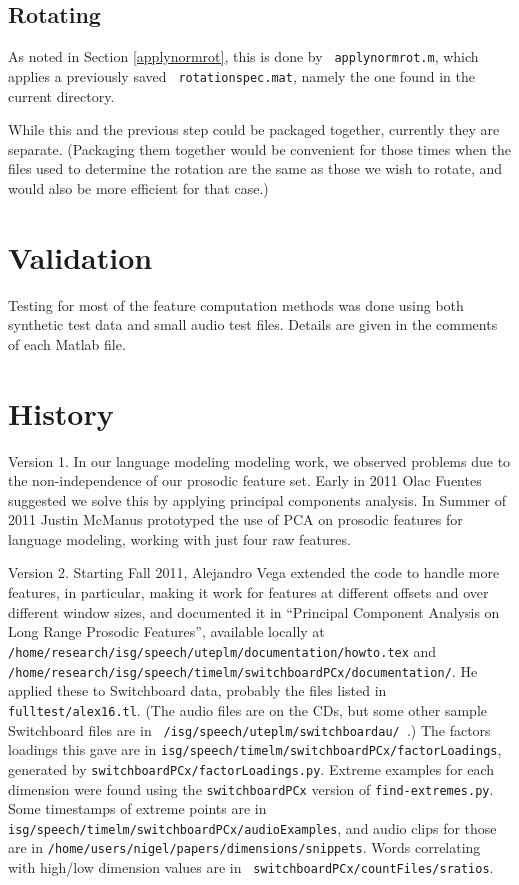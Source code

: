 \documentclass[11pt]{article}
\begin{document}
\subsection{Rotating}

As noted in Section \ref{applynormrot}, this is done by {\tt
  applynormrot.m}, which applies a previously saved {\tt
  rotationspec.mat}, namely the one found in the current directory.

While this and the previous step could be packaged together, currently
they are separate.  (Packaging them together would be convenient for
those times when the files used to determine the rotation are the same
as those we wish to rotate, and would also be more efficient for that case.)


\section{Validation}

Testing for most of the feature computation methods was done using
both synthetic test data and small audio test files.  Details are
given in the comments of each Matlab file.


\section{History}

Version 1.  In our language modeling modeling work, we observed
problems due to the non-independence of our prosodic feature set.
Early in 2011 Olac Fuentes suggested we solve this by applying
principal components analysis.  In Summer of 2011 Justin McManus
prototyped the use of PCA on prosodic features for language modeling,
working with just four raw features.

Version 2. Starting Fall 2011, Alejandro Vega extended the code to
handle more features, in particular, making it work for features at
different offsets and over different window sizes, and documented it
in ``Principal Component Analysis on Long Range Prosodic Features'',
available locally at {\tt
  /home/research/isg/speech/uteplm/documentation/howto.tex} and {\tt
  /home/research/isg/speech/timelm/switchboardPCx/documentation/}.  He
applied these to Switchboard data, probably the files listed in {\tt
  fulltest/alex16.tl}.  (The audio files are on the CDs, but some
other sample Switchboard files are in {\tt
  /isg/speech/uteplm/switchboardau/ }.)  The factors loadings this
gave are in {\tt isg/speech/timelm/switchboardPCx/factorLoadings},
generated by {\tt switchboardPCx/factorLoadings.py}.  Extreme examples
for each dimension were found using the {\tt switchboardPCx} version
of {\tt find-extremes.py}.  Some timestamps of extreme points are in
{\tt isg/speech/timelm/switchboardPCx/audioExamples}, and audio clips
for those are in {\tt /home/users/nigel/papers/dimensions/snippets}.
Words correlating with high/low dimension values are in {\tt
  switchboardPCx/countFiles/sratios}.
\end{document}
